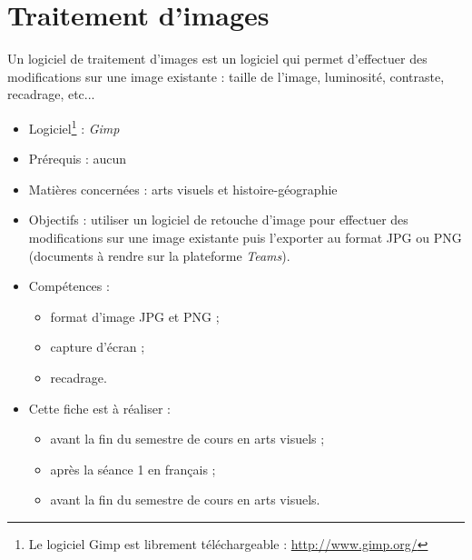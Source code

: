 \chapter{Traitement d'images}\label{ficheImage1}  

Un logiciel de traitement d'images est un logiciel qui permet d'effectuer des modifications sur une image existante : taille de l'image, luminosité, contraste, recadrage, etc...\\


\begin{itemize}
\item Logiciel\footnote{Le logiciel Gimp est librement téléchargeable : \url{http://www.gimp.org/}} : \emph{Gimp}
\item Prérequis : aucun
\item Matières concernées : arts visuels et histoire-géographie
\item Objectifs : utiliser un logiciel de retouche d'image pour effectuer des modifications sur une image existante puis l'exporter au format JPG ou PNG (documents à rendre sur la plateforme \emph{Teams}).
\item Compétences : 
        \begin{itemize}
        \item format d'image JPG et PNG ;
        \item capture d'écran ;
        \item recadrage.
        \end{itemize}
\item Cette fiche est à réaliser :
        \begin{itemize}
        \item avant la fin du semestre de cours en arts visuels ;
        \item après la séance 1 en français  ;
        \item avant la fin du semestre de cours en arts visuels. 
        \end{itemize}
\end{itemize}







